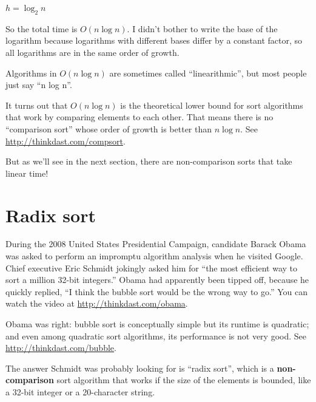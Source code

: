 \documentclass[12pt]{book}
\theoremstyle{exercise}
\begin{document}
$h = \log_2 n$

So the total time is $O(n \log n)$. I didn't bother to write the
base of the logarithm because logarithms with different bases differ by
a constant factor, so all logarithms are in the same order of growth.


Algorithms in $O(n \log n)$ are sometimes called
``linearithmic'', but most people just say ``n log n''.


It turns out that $O(n \log n)$ is the theoretical lower bound for
sort algorithms that work by comparing elements to each other. That
means there is no ``comparison sort'' whose order of growth is better
than $n \log n$.  See \url{http://thinkdast.com/compsort}.

But as we'll see in the next section, there are non-comparison sorts
that take linear time!



\section{Radix sort}
\label{radix-sort}


During the 2008 United States Presidential Campaign, candidate Barack
Obama was asked to perform an impromptu algorithm analysis when he
visited Google. Chief executive Eric Schmidt jokingly asked him for
``the most efficient way to sort a million 32-bit integers.'' Obama
had apparently been tipped off, because he quickly replied, ``I think
the bubble sort would be the wrong way to go.'' You can watch the
video at \url{http://thinkdast.com/obama}.

Obama was right: bubble sort is conceptually simple but its runtime is
quadratic; and even among quadratic sort algorithms, its performance
is not very good.  See \url{http://thinkdast.com/bubble}.


The answer Schmidt was probably looking for is ``radix sort'', which is
a {\bf non-comparison} sort algorithm that works if the size of the
elements is bounded, like a 32-bit integer or a 20-character string.

\end{document}
